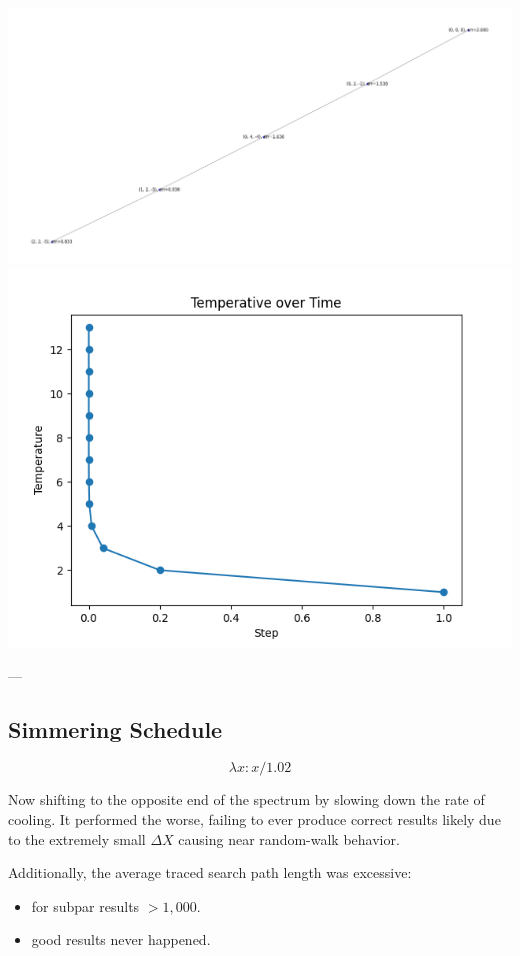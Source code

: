 \documentclass{article}
\begin{document}
\includegraphics[width=6in]{_static/Figure_4_Temp=5_Path=5.png}
\includegraphics[width=6in]{_static/Figure_7_Temp=5_Temp-over-Time.png}

---

\subsection{Simmering Schedule}

$$\lambda x : x / 1.02$$

Now shifting to the opposite end of the spectrum by slowing down the rate of cooling.
It performed the worse, failing to ever produce correct results 
likely due to the extremely small $\Delta X$ causing near random-walk behavior.

Additionally, the average traced search path length was excessive:

\begin{itemize}
    \item for subpar results $> 1,000$.
    \item good results never happened.
\end{itemize}
\end{document}
